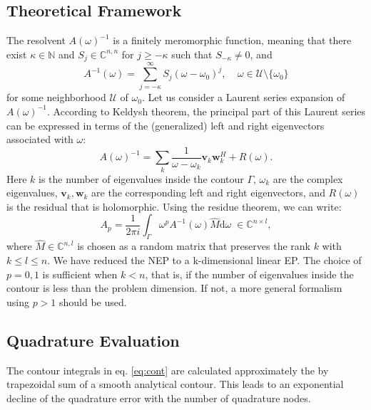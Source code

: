 \documentclass[11pt,letterpaper]{article}
\newcommand{\diff}{\mathrm{d}}
\begin{document}
\subsection{Theoretical Framework}
The resolvent $A(\omega)^{-1}$ is a finitely meromorphic function, meaning that there exist $\kappa\in\mathbb{N}$ and $S_j\in \mathbb{C}^{n,n}$ for $j\geq -\kappa$ such that $S_{-\kappa}\neq 0$, and 
\begin{equation}\label{eq:Ainv}
A^{-1}(\omega)=\sum\limits_{j=-\kappa}^{\infty} S_j (\omega-\omega_0)^j,\;\;
\;\; \omega \in \mathcal{U} \setminus \lbrace\omega_0 \rbrace 
\end{equation}
for some neighborhood $\mathcal{U}$ of $\omega_0$. Let us consider a Laurent series expansion of $A(\omega)^{-1}$. According to Keldysh theorem, \citep{keldysh1951characteristic, beyn_integral_2012} the principal part of this Laurent series can be expressed in terms of the (generalized) left and right eigenvectors associated with $\omega$:
\begin{equation}
\label{eq:Keldysh}
A(\omega)^{-1} = \sum\limits_{k}\frac{1}{\omega-\omega_k}\mathbf{v}_k\mathbf{w}_k^H + R(\omega).
\end{equation}
Here $k$ is the number of eigenvalues inside the contour $\Gamma$, $\omega_k$ are the complex eigenvalues, $\mathbf{v}_k, \mathbf{w}_k$ are the corresponding left and right eigenvectors, and $R(\omega)$ is the residual that is holomorphic. Using the residue theorem, we can write: 
\begin{equation}\label{eq:cont}
A_{p} = \frac{1}{2\pi i}\int_{\Gamma}\omega^p A^{-1}(\omega)\hat{M} \diff\omega \;\in\mathbb{C}^{n \times l},
\end{equation}
where $\hat{M} \in \mathbb{C}^{n,l}$ is chosen as a random matrix that preserves the rank $k$ with $k \leq l \leq n$. We have reduced the NEP to a k-dimensional linear EP. The choice of $p=0,1$ is sufficient when $k<n$, that is, if the number of eigenvalues inside the contour is less than the problem dimension. If not, a more general formalism using $p > 1$ should be used. \citep{beyn_integral_2012}

\subsection{Quadrature Evaluation}
The contour integrals in eq. \ref{eq:cont} are calculated approximately the by trapezoidal sum of a smooth analytical contour. This leads to an exponential decline of the quadrature error with the number of quadrature nodes.
\end{document}
